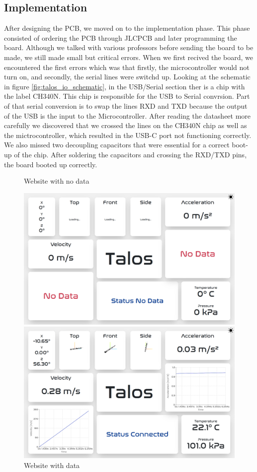 \documentclass{article}
\begin{document}
\subsection{Implementation}
After designing the PCB, we moved on to the implementation phase. This phase consisted of ordering the PCB through JLCPCB and later programming the board. Although we talked with various professors before sending the board to be made, we still made small but critical errors. When we first recived the board, we encountered the first errors which was that firstly, the microcontroller would not turn on, and secondly, the serial lines were switchd up. Looking at the schematic in figure \ref{fig:talos_io_schematic}, in the USB/Serial section ther is a chip with the label CH340N. This chip is responsible for the USB to Serial convrsion. Part of that serial conversion is to swap the lines RXD and TXD because the output of the USB is the input to the Microcontroller. After reading the datasheet more carefully we discovered that we crossed the lines on the CH340N chip as well as the mictrocontroller, which resulted in the USB-C port not functioning correctly. We also missed two decoupling capacitors that were essential for a correct boot-up of the chip. After soldering the capacitors and crossing the RXD/TXD pins, the board booted up correctly.
\begin{figure}[h]
      \caption{Website with no data}
      \label{fig:website_no_data}
      \centering
      \includegraphics[width=\textwidth]{website_no_data.png}
      \caption{Website with data}
      \label{fig:website_data}
      \includegraphics[width=\textwidth]{website_data.png}
\end{figure}
\end{document}
